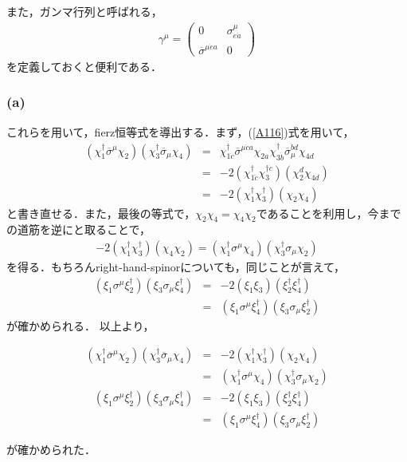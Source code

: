 また，ガンマ行列と呼ばれる，
\begin{eqnarray}
\gamma^{\mu}=\left(\begin{array}{cc}0 & \sigma^{\mu}_{e\dot{a}} \\\overline{\sigma}^{\mu\dot{e}a} & 0\end{array}\right)
\end{eqnarray}を定義しておくと便利である．
\subsubsection{(a)}
これらを用いて，fierz恒等式を導出する．まず，(\ref{A116})式を用いて，
\begin{eqnarray}
(\chi_{1}^{\dagger}\overline{\sigma}^{\mu}\chi_{2})(\chi_{3}^{\dagger}\overline{\sigma}_{\mu}\chi_{4})&=&\chi_{1\dot{c}}^{\dagger}\overline{\sigma}^{\mu\dot{c}a}\chi_{2a}\chi_{3\dot{b}}^{\dagger}\overline{\sigma}_{\mu}^{\dot{b}d}\chi_{4d} \\
&=&-2(\chi_{1\dot{c}}^{\dagger}\chi_{3}^{\dagger\dot{c}})(\chi_{2}^{d}\chi_{4d}) \\
&=&-2(\chi_{1}^{\dagger}\chi_{3}^{\dagger})(\chi_{2}\chi_{4})
\end{eqnarray}
と書き直せる．また，最後の等式で，$\chi_{2}\chi_{4}=\chi_{4}\chi_{2}$であることを利用し，今までの道筋を逆にと取ることで，
\begin{eqnarray}
-2(\chi_{1}^{\dagger}\chi_{3}^{\dagger})(\chi_{4}\chi_{2})=(\chi_{1}^{\dagger}\sigma^{\mu}\chi_{4})(\chi_{3}^{\dagger}\sigma_{\mu}\chi_{2})
\end{eqnarray}
を得る．もちろんright-hand-spinorについても，同じことが言えて，
\begin{eqnarray}
(\xi_{1}\sigma^{\mu}\xi^{\dagger}_{2})(\xi_{3}\sigma_{\mu}\xi^{\dagger}_{4})&=&-2(\xi_{1}\xi_{3})(\xi_{2}^{\dagger}\xi_{4}^{\dagger}) \\
&=&(\xi_{1}\sigma^{\mu}\xi^{\dagger}_{4})(\xi_{3}\sigma_{\mu}\xi^{\dagger}_{2})
\end{eqnarray}
が確かめられる．
以上より，
\begin{empheqboxed}

\begin{eqnarray}
\label{A126}
(\chi_{1}^{\dagger}\overline{\sigma}^{\mu}\chi_{2})(\chi_{3}^{\dagger}\overline{\sigma}_{\mu}\chi_{4})&=&-2(\chi_{1}^{\dagger}\chi_{3}^{\dagger})(\chi_{2}\chi_{4}) \\
\label{A127}
&=&(\chi_{1}^{\dagger}\sigma^{\mu}\chi_{4})(\chi_{3}^{\dagger}\sigma_{\mu}\chi_{2})
\end{eqnarray}
\begin{eqnarray}
\label{A128}
(\xi_{1}\sigma^{\mu}\xi^{\dagger}_{2})(\xi_{3}\sigma_{\mu}\xi^{\dagger}_{4})&=&-2(\xi_{1}\xi_{3})(\xi_{2}^{\dagger}\xi_{4}^{\dagger}) \\
\label{A129}
&=&(\xi_{1}\sigma^{\mu}\xi^{\dagger}_{4})(\xi_{3}\sigma_{\mu}\xi^{\dagger}_{2})
\end{eqnarray}

\end{empheqboxed}
が確かめられた．
